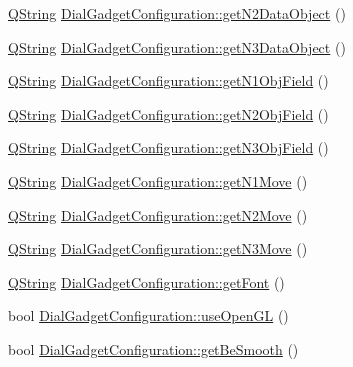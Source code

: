 \begin{DoxyCompactItemize}
\hyperlink{group___u_a_v_objects_plugin_gab9d252f49c333c94a72f97ce3105a32d}{\-Q\-String} \hyperlink{group___dial_plugin_gad43052a508249d44990774c7ec443715}{\-Dial\-Gadget\-Configuration\-::get\-N2\-Data\-Object} ()
\item 
\hyperlink{group___u_a_v_objects_plugin_gab9d252f49c333c94a72f97ce3105a32d}{\-Q\-String} \hyperlink{group___dial_plugin_gaecd0eec0153c2fbc4ee5715e8f4eb343}{\-Dial\-Gadget\-Configuration\-::get\-N3\-Data\-Object} ()
\item 
\hyperlink{group___u_a_v_objects_plugin_gab9d252f49c333c94a72f97ce3105a32d}{\-Q\-String} \hyperlink{group___dial_plugin_gaf4bf508f606e67bd5355ed00af142027}{\-Dial\-Gadget\-Configuration\-::get\-N1\-Obj\-Field} ()
\item 
\hyperlink{group___u_a_v_objects_plugin_gab9d252f49c333c94a72f97ce3105a32d}{\-Q\-String} \hyperlink{group___dial_plugin_ga4a2ae0e302559adb0a0c9e46d885165d}{\-Dial\-Gadget\-Configuration\-::get\-N2\-Obj\-Field} ()
\item 
\hyperlink{group___u_a_v_objects_plugin_gab9d252f49c333c94a72f97ce3105a32d}{\-Q\-String} \hyperlink{group___dial_plugin_gaa6a05e10dd1da379ed964050e753d1cf}{\-Dial\-Gadget\-Configuration\-::get\-N3\-Obj\-Field} ()
\item 
\hyperlink{group___u_a_v_objects_plugin_gab9d252f49c333c94a72f97ce3105a32d}{\-Q\-String} \hyperlink{group___dial_plugin_ga694808f332bd385339fa07b6aa6ad67b}{\-Dial\-Gadget\-Configuration\-::get\-N1\-Move} ()
\item 
\hyperlink{group___u_a_v_objects_plugin_gab9d252f49c333c94a72f97ce3105a32d}{\-Q\-String} \hyperlink{group___dial_plugin_gaa268e84615e3dfe79b2ea85a21015c0f}{\-Dial\-Gadget\-Configuration\-::get\-N2\-Move} ()
\item 
\hyperlink{group___u_a_v_objects_plugin_gab9d252f49c333c94a72f97ce3105a32d}{\-Q\-String} \hyperlink{group___dial_plugin_ga8b12211d47ec10eb85af4daeecd76cff}{\-Dial\-Gadget\-Configuration\-::get\-N3\-Move} ()
\item 
\hyperlink{group___u_a_v_objects_plugin_gab9d252f49c333c94a72f97ce3105a32d}{\-Q\-String} \hyperlink{group___dial_plugin_ga2b36383d1efea1dc3848e79d6b73ab32}{\-Dial\-Gadget\-Configuration\-::get\-Font} ()
\item 
bool \hyperlink{group___dial_plugin_ga71692739b0299dea2c880fc33df5817f}{\-Dial\-Gadget\-Configuration\-::use\-Open\-G\-L} ()
\item 
bool \hyperlink{group___dial_plugin_ga47cfbeb46101ecdebf8073f133bbbbc1}{\-Dial\-Gadget\-Configuration\-::get\-Be\-Smooth} ()

\end{DoxyCompactItemize}

